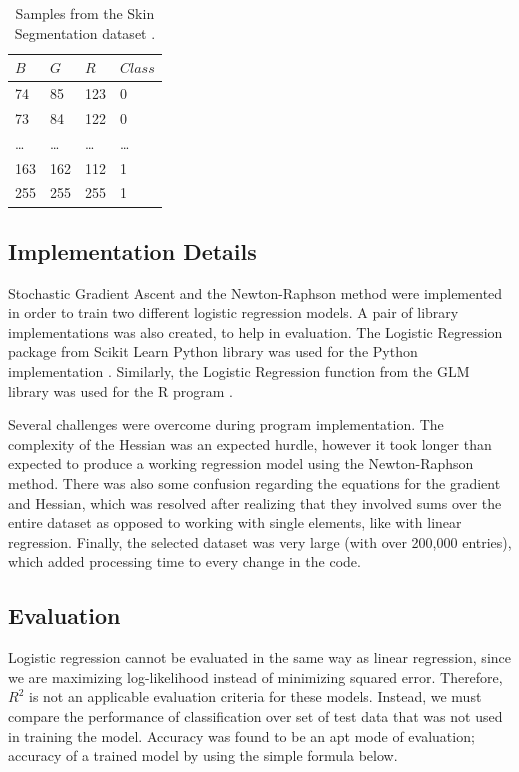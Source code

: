 \documentclass[letterpaper]{article} %
\begin{document}
\begin{table}[t]
\begin{centering}
\bgroup
\def\arraystretch{1.5}
\begin{tabular}{| m{} | m{} | m{} | m{} |} 
\hline
$B$ & $G$ & $R$ & $Class$ \\ 
\hline
\hline
74 & 85 & 123 & 0 \\ 
\hline
73 & 84 & 122 & 0 \\ 
\hline
\ldots & \ldots & \ldots & \ldots \\ 
\hline
163 & 162 & 112 & 1 \\ 
\hline
255 & 255 & 255 & 1 \\ 
\hline
\end{tabular}
\caption{Samples from the Skin Segmentation dataset \cite{skin}.}
\label{tbl:data}
\egroup
\end{centering}
\end{table}

\subsection{Implementation Details}
Stochastic Gradient Ascent and the Newton-Raphson method were implemented
in order to train two different logistic regression models.
A pair of library implementations was also created, to help in evaluation.
The Logistic Regression package from Scikit Learn Python library was used 
for the Python implementation \cite{python}.
Similarly, the Logistic Regression function from the GLM library was used
for the R program \cite{r}.

Several challenges were overcome during program implementation.
The complexity of the Hessian was an expected hurdle, however it took longer
than expected to produce a working regression model using the Newton-Raphson method.
There was also some confusion regarding the equations for the gradient and Hessian,
which was resolved after realizing that they involved sums over the entire dataset
as opposed to working with single elements, like with linear regression.
Finally, the selected dataset was very large (with over 200,000 entries), which added processing time
to every change in the code.

\subsection{Evaluation}
Logistic regression cannot be evaluated in the same way as linear regression,
since we are maximizing log-likelihood instead of minimizing squared error.
Therefore, $R^2$ is not an applicable evaluation criteria for these models.
Instead, we must compare the performance of classification over set of test data
that was not used in training the model.
Accuracy was found to be an apt mode of evaluation;
accuracy of a trained model by using the simple formula below.
\end{document}
